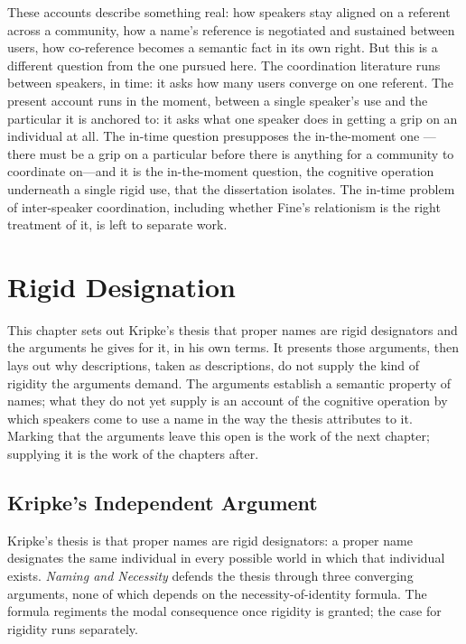 \documentclass[12pt,a4paper]{article}
\begin{document}
These accounts describe something real: how speakers stay aligned on a referent across a community, how a name's reference is negotiated and sustained between users, how co-reference becomes a semantic fact in its own right. But this is a different question from the one pursued here. The coordination literature runs between speakers, in time: it asks how many users converge on one referent. The present account runs in the moment, between a single speaker's use and the particular it is anchored to: it asks what one speaker does in getting a grip on an individual at all. The in-time question presupposes the in-the-moment one --- there must be a grip on a particular before there is anything for a community to coordinate on---and it is the in-the-moment question, the cognitive operation underneath a single rigid use, that the dissertation isolates. The in-time problem of inter-speaker coordination, including whether Fine's relationism is the right treatment of it, is left to separate work.

\section{Rigid Designation}\label{rigid-designation}

This chapter sets out Kripke's thesis that proper names are rigid designators and the arguments he gives for it, in his own terms. It presents those arguments, then lays out why descriptions, taken as descriptions, do not supply the kind of rigidity the arguments demand. The arguments establish a semantic property of names; what they do not yet supply is an account of the cognitive operation by which speakers come to use a name in the way the thesis attributes to it. Marking that the arguments leave this open is the work of the next chapter; supplying it is the work of the chapters after.

\subsection{Kripke's Independent Argument}\label{kripkes-independent-argument}

Kripke's thesis is that proper names are rigid designators: a proper name designates the same individual in every possible world in which that individual exists. \emph{Naming and Necessity} defends the thesis through three converging arguments, none of which depends on the necessity-of-identity formula. The formula regiments the modal consequence once rigidity is granted; the case for rigidity runs separately.
\end{document}
